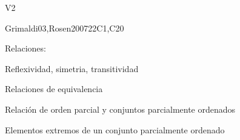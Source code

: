 \begin{syllabus}
\begin{competences}{V2}
    \item {}
    \item {}
\end{competences}

\begin{unit}{\DSSetsRelationsandFunctions}{}{Grimaldi03,Rosen2007}{22}{C1,C20}
   \begin{topics}
        \item \DSSetsRelationsandFunctionsTopicSets
        \item Relaciones:
        \begin{subtopics}
            \item Reflexividad, simetria, transitividad
            \item Relaciones de equivalencia
            \item Relación de orden parcial y conjuntos parcialmente ordenados
            \item Elementos extremos de un conjunto parcialmente ordenado
        \end{subtopics}
        \item \DSSetsRelationsandFunctionsTopicFunctions
   \end{topics}
   \begin{learningoutcomes}
	\item \DSSetsRelationsandFunctionsLOExplainWith [\Assessment]
	\item \DSSetsRelationsandFunctionsLOPerformThe [\Assessment]
	\item \DSSetsRelationsandFunctionsLORelate [\Assessment]
   \end{learningoutcomes}
 \end{unit}


\end{syllabus}
